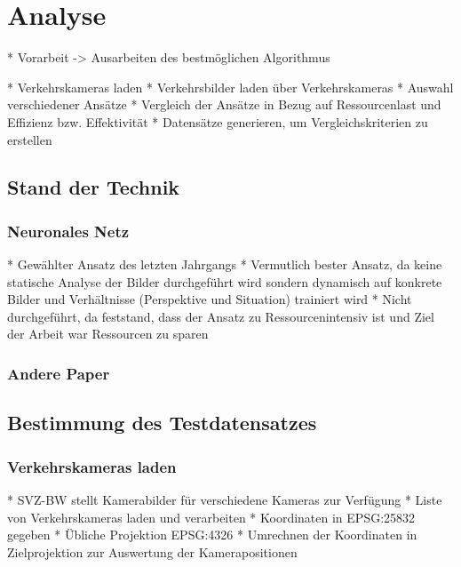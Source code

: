 \chapter{Analyse}
* Vorarbeit -> Ausarbeiten des bestmöglichen Algorithmus\newline

* Verkehrskameras laden\newline
* Verkehrsbilder laden über Verkehrskameras\newline
* Auswahl verschiedener Ansätze\newline
* Vergleich der Ansätze in Bezug auf Ressourcenlast und Effizienz bzw. Effektivität\newline
* Datensätze generieren, um Vergleichskriterien zu erstellen\newline

\section{Stand der Technik}

\subsection{Neuronales Netz}
* Gewählter Ansatz des letzten Jahrgangs\newline
* Vermutlich bester Ansatz, da keine statische Analyse der Bilder durchgeführt wird\newline
	sondern dynamisch auf konkrete Bilder und Verhältnisse (Perspektive und Situation) trainiert wird
* Nicht durchgeführt, da feststand, dass der Ansatz zu Ressourcenintensiv ist und Ziel der Arbeit war Ressourcen zu sparen\newline

\subsection{Andere Paper}

\section{Bestimmung des Testdatensatzes}
\subsection{Verkehrskameras laden}
* SVZ-BW stellt Kamerabilder für verschiedene Kameras zur Verfügung\newline
* Liste von Verkehrskameras laden und verarbeiten\newline %
* Koordinaten in EPSG:25832 gegeben\newline %
* Übliche Projektion EPSG:4326\newline %
* Umrechnen der Koordinaten in Zielprojektion zur Auswertung der Kamerapositionen\newline

